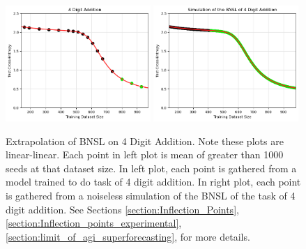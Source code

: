 \documentclass{article} %
\begin{document}
\begin{figure}[htbp]
    \centering


\includegraphics[width=0.49\textwidth]{figures/arithmetic/4_digit_addition__dataset_size.png}
\includegraphics[width=0.49\textwidth]{figures/arithmetic/4_digit_addition__dataset_size__very_first_version__simulation_limit.png}
\vspace{-4.7mm}
    \caption{
    Extrapolation of BNSL on 4 Digit Addition. Note these plots are linear-linear. Each point in left plot is mean of greater than 1000 seeds at that dataset size. In left plot, each point is gathered from a model trained to do task of 4 digit addition. In right plot, each point is gathered from a noiseless simulation of the BNSL of the task of 4 digit addition. See Sections \ref{section:Inflection_Points}, \ref{section:Inflection_points_experimental}, \ref{section:limit_of_agi_superforecasting}, for more details.
    }
    \label{fig:arithmetic}
\end{figure}
\vspace{-3.0mm}
\FloatBarrier

\vspace{-2.0mm}
\end{document}

